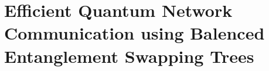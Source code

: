 \chapter{Efficient Quantum Network Communication using Balenced Entanglement Swapping Trees}
\label{chap:tqe}


              


% 

%  
% 



%     
